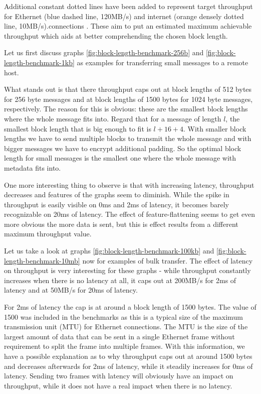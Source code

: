 Additional constant dotted lines have been added to represent target throughput for Ethernet (blue dashed line, 120MB/s) and internet (orange densely dotted line, 10MB/s).connections .
These aim to put an estimated maximum achievable throughput which aids at better comprehending the chosen block length.

\medskip

Let us first discuss graphs \ref{fig:block-length-benchmark-256b} and \ref{fig:block-length-benchmark-1kb} as examples for transferring small messages to a remote host.

What stands out is that there throughput caps out at block lengths of 512 bytes for 256 byte messages and at block lengths of 1500 bytes for 1024 byte messages, respectively.
The reason for this is obvious: these are the smallest block lengths where the whole message fits into.
Regard that for a message of length $l$, the smallest block length that is big enough to fit is $l + 16 + 4$.
With smaller block lengths we have to send multiple blocks to transmit the whole message and with bigger messages we have to encrypt additional padding.
So the optimal block length for small messages is the smallest one where the whole message with metadata fits into.

One more interesting thing to observe is that with increasing latency, throughput decreases and features of the graphs seem to diminish.
While the spike in throughput is easily visible on 0ms and 2ms of latency, it becomes barely recognizable on 20ms of latency.
The effect of feature-flattening seems to get even more obvious the more data is sent, but this is effect results from a different maximum throughput value.

Let us take a look at graphs \ref{fig:block-length-benchmark-100kb} and \ref{fig:block-length-benchmark-10mb} now for examples of bulk transfer.
The effect of latency on throughput is very interesting for these graphs - while throughput constantly increases when there is no latency at all, it caps out at 200MB/s for 2ms of latency and at 50MB/s for 20ms of latency.

For 2ms of latency the cap is at around a block length of 1500 bytes.
The value of 1500 was included in the benchmarks as this is a typical size of the maximum transmission unit (MTU) for Ethernet connections.
The MTU is the size of the largest amount of data that can be sent in a single Ethernet frame without requirement to split the frame into multiple frames.
With this information, we have a possible explanation as to why throughput caps out at around 1500 bytes and decreases afterwards for 2ms of latency, while it steadily increases for 0ms of latency.
Sending two frames with latency will obviously have an impact on throughput, while it does not have a real impact when there is no latency.

